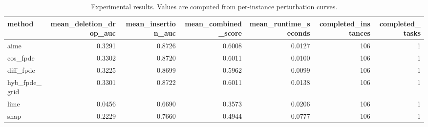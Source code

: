 \begin{table}[t]
\caption{Experimental results. Values are computed from per-instance perturbation curves.}
\label{tab:main_results_computed}
\centering
\begin{tabular}{lrrrrrr}
\toprule
method & mean\_deletion\_drop\_auc & mean\_insertion\_auc & mean\_combined\_score & mean\_runtime\_seconds & completed\_instances & completed\_tasks \\
\midrule
aime & 0.3291 & 0.8726 & 0.6008 & 0.0127 & 106 & 1 \\
cos\_fpde & 0.3302 & 0.8720 & 0.6011 & 0.0100 & 106 & 1 \\
diff\_fpde & 0.3225 & 0.8699 & 0.5962 & 0.0099 & 106 & 1 \\
hyb\_fpde\_grid & 0.3301 & 0.8722 & 0.6011 & 0.0138 & 106 & 1 \\
lime & 0.0456 & 0.6690 & 0.3573 & 0.0206 & 106 & 1 \\
shap & 0.2229 & 0.7660 & 0.4944 & 0.0777 & 106 & 1 \\
\bottomrule
\end{tabular}

\end{table}
